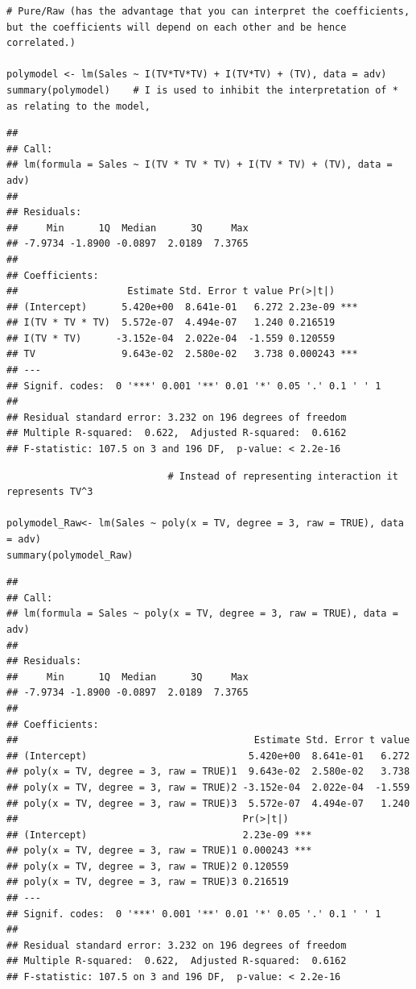 \documentclass[11pt]{article}
\begin{document}
\begin{verbatim}
# Pure/Raw (has the advantage that you can interpret the coefficients, but the coefficients will depend on each other and be hence correlated.)

polymodel <- lm(Sales ~ I(TV*TV*TV) + I(TV*TV) + (TV), data = adv)
summary(polymodel)    # I is used to inhibit the interpretation of * as relating to the model,
\end{verbatim}

\begin{verbatim}
## 
## Call:
## lm(formula = Sales ~ I(TV * TV * TV) + I(TV * TV) + (TV), data = adv)
## 
## Residuals:
##     Min      1Q  Median      3Q     Max 
## -7.9734 -1.8900 -0.0897  2.0189  7.3765 
## 
## Coefficients:
##                   Estimate Std. Error t value Pr(>|t|)    
## (Intercept)      5.420e+00  8.641e-01   6.272 2.23e-09 ***
## I(TV * TV * TV)  5.572e-07  4.494e-07   1.240 0.216519    
## I(TV * TV)      -3.152e-04  2.022e-04  -1.559 0.120559    
## TV               9.643e-02  2.580e-02   3.738 0.000243 ***
## ---
## Signif. codes:  0 '***' 0.001 '**' 0.01 '*' 0.05 '.' 0.1 ' ' 1
## 
## Residual standard error: 3.232 on 196 degrees of freedom
## Multiple R-squared:  0.622,  Adjusted R-squared:  0.6162 
## F-statistic: 107.5 on 3 and 196 DF,  p-value: < 2.2e-16
\end{verbatim}

\begin{verbatim}
                            # Instead of representing interaction it represents TV^3

polymodel_Raw<- lm(Sales ~ poly(x = TV, degree = 3, raw = TRUE), data = adv)
summary(polymodel_Raw)
\end{verbatim}

\begin{verbatim}
## 
## Call:
## lm(formula = Sales ~ poly(x = TV, degree = 3, raw = TRUE), data = adv)
## 
## Residuals:
##     Min      1Q  Median      3Q     Max 
## -7.9734 -1.8900 -0.0897  2.0189  7.3765 
## 
## Coefficients:
##                                         Estimate Std. Error t value
## (Intercept)                            5.420e+00  8.641e-01   6.272
## poly(x = TV, degree = 3, raw = TRUE)1  9.643e-02  2.580e-02   3.738
## poly(x = TV, degree = 3, raw = TRUE)2 -3.152e-04  2.022e-04  -1.559
## poly(x = TV, degree = 3, raw = TRUE)3  5.572e-07  4.494e-07   1.240
##                                       Pr(>|t|)    
## (Intercept)                           2.23e-09 ***
## poly(x = TV, degree = 3, raw = TRUE)1 0.000243 ***
## poly(x = TV, degree = 3, raw = TRUE)2 0.120559    
## poly(x = TV, degree = 3, raw = TRUE)3 0.216519    
## ---
## Signif. codes:  0 '***' 0.001 '**' 0.01 '*' 0.05 '.' 0.1 ' ' 1
## 
## Residual standard error: 3.232 on 196 degrees of freedom
## Multiple R-squared:  0.622,  Adjusted R-squared:  0.6162 
## F-statistic: 107.5 on 3 and 196 DF,  p-value: < 2.2e-16
\end{verbatim}
\end{document}
